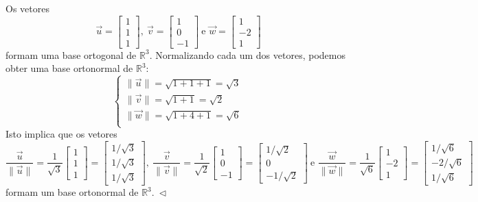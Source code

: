 \documentclass[../livro.tex]{subfiles}  %
\begin{document}
\begin{example}
	Os vetores 
	\begin{equation}
	\vec{u} =
	\begin{bmatrix}
	1 \\ 1 \\ 1
	\end{bmatrix}, \
	\vec{v} =
	\begin{bmatrix}
	1 \\ 0 \\ -1
	\end{bmatrix} \ \text{e }
	\vec{w} =
	\begin{bmatrix}
	1 \\ -2 \\ 1
	\end{bmatrix}
	\end{equation} formam uma base ortogonal de $\mathbb{R}^3$. Normalizando cada um dos vetores, podemos obter uma base ortonormal de $\mathbb{R}^3$:
	\begin{equation}
	\left\{
	\begin{array}{ll}
	\|\vec{u}\| = \sqrt{1 + 1 + 1} = \sqrt{3} \\
	\|\vec{v}\| = \sqrt{1 + 1} = \sqrt{2} \\
	\|\vec{w}\| = \sqrt{1 + 4 + 1} = \sqrt{6} \\
	\end{array}
	\right.
	\end{equation} Isto implica que os vetores
	\begin{equation}
	\frac{\vec{u}}{\|\vec{u}\|} = \frac{1}{\sqrt{3}}
	\begin{bmatrix}
	1 \\ 1 \\ 1
	\end{bmatrix} = 
	\begin{bmatrix}
	1/\sqrt{3} \\ 1/\sqrt{3} \\ 1/\sqrt{3}
	\end{bmatrix}, \
	\frac{\vec{v}}{\|\vec{v}\|} = \frac{1}{\sqrt{2}}
	\begin{bmatrix}
	1 \\ 0 \\ -1
	\end{bmatrix} =
	\begin{bmatrix}
	1/\sqrt{2} \\ 0 \\ -1/\sqrt{2}
	\end{bmatrix} \ \text{e }
	\frac{\vec{w}}{\|\vec{w}\|} = \frac{1}{\sqrt{6}}
	\begin{bmatrix}
	1 \\ -2 \\ 1
	\end{bmatrix} = 
	\begin{bmatrix}
	1/\sqrt{6} \\ -2/\sqrt{6} \\ 1/\sqrt{6}
	\end{bmatrix}
	\end{equation} formam um base ortonormal de $\mathbb{R}^3. \ \lhd$
\end{example}
\end{document}
